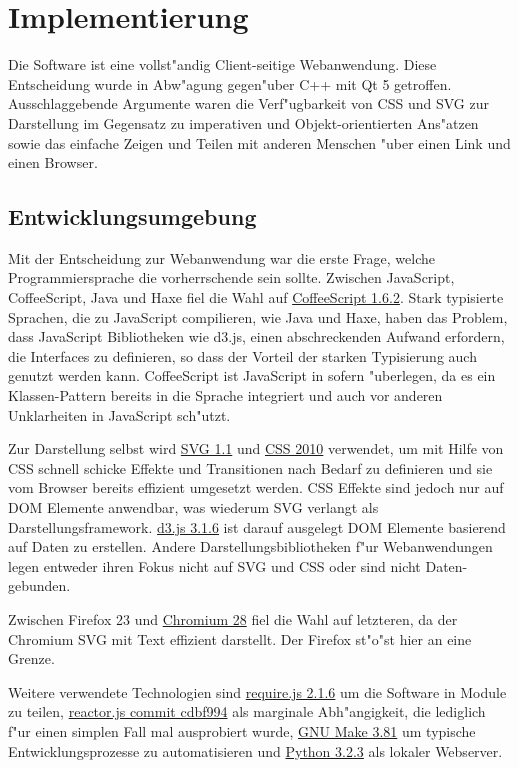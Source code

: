 \section{Implementierung}

Die Software ist eine vollst"andig Client-seitige Webanwendung. Diese
Entscheidung wurde in Abw"agung gegen"uber C++ mit Qt 5 getroffen.
Ausschlaggebende Argumente waren die Verf"ugbarkeit von CSS und SVG zur
Darstellung im Gegensatz zu imperativen und Objekt-orientierten Ans"atzen
sowie das einfache Zeigen und Teilen mit anderen Menschen "uber einen
Link und einen Browser.

\subsection{Entwicklungsumgebung}

Mit der Entscheidung zur Webanwendung war die erste Frage, welche
Programmiersprache die vorherrschende sein sollte. Zwischen JavaScript,
CoffeeScript, Java und Haxe fiel die Wahl auf
\href{http://coffeescript.org/}{CoffeeScript 1.6.2}. Stark typisierte
Sprachen, die zu JavaScript compilieren, wie Java und Haxe, haben das
Problem, dass JavaScript Bibliotheken wie d3.js, einen abschreckenden
Aufwand erfordern, die Interfaces zu definieren, so dass der Vorteil der
starken Typisierung auch genutzt werden kann. CoffeeScript ist
JavaScript in sofern "uberlegen, da es ein Klassen-Pattern bereits in die
Sprache integriert und auch vor anderen Unklarheiten in JavaScript
sch"utzt.

Zur Darstellung selbst wird \href{http://www.w3.org/TR/SVG11/}{SVG 1.1}
und \href{http://www.w3.org/TR/css-2010/}{CSS 2010} verwendet, um mit
Hilfe von CSS schnell schicke Effekte und Transitionen nach Bedarf zu
definieren und sie vom Browser bereits effizient umgesetzt werden. CSS
Effekte sind jedoch nur auf DOM Elemente anwendbar, was wiederum SVG
verlangt als Darstellungsframework. \href{http://d3js.org/}{d3.js 3.1.6}
ist darauf ausgelegt DOM Elemente basierend auf Daten zu erstellen.
Andere Darstellungsbibliotheken f"ur Webanwendungen legen entweder ihren
Fokus nicht auf SVG und CSS oder sind nicht Daten-gebunden.

Zwischen Firefox 23 und \href{http://www.chromium.org/Home}{Chromium 28}
fiel die Wahl auf letzteren, da der Chromium SVG mit Text effizient
darstellt. Der Firefox st"o"st hier an eine Grenze.

Weitere verwendete Technologien sind
\href{http://requirejs.org/}{require.js 2.1.6} um die Software in Module
zu teilen, \href{https://github.com/fynyky/reactor.js}{reactor.js commit
cdbf994} als marginale Abh"angigkeit, die lediglich f"ur einen simplen
Fall mal ausprobiert wurde,
\href{https://www.gnu.org/software/make/}{GNU Make 3.81} um typische
Entwicklungsprozesse zu automatisieren und
\href{http://python.org/}{Python 3.2.3} als lokaler Webserver.

